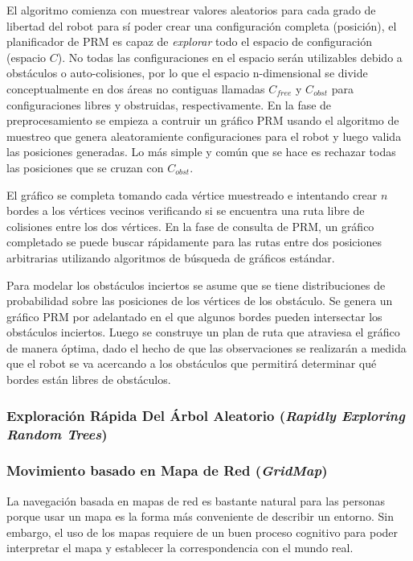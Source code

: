 El algoritmo comienza con muestrear valores aleatorios para cada grado de 
libertad del robot para s\'i poder crear una configuraci\'on completa 
(posici\'on), el planificador de PRM es capaz de \textit{explorar} todo 
el espacio de configuraci\'on (espacio $C$). No todas las configuraciones 
en el espacio ser\'an utilizables debido a obst\'aculos o auto-colisiones, 
por lo que el espacio n-dimensional se divide conceptualmente en dos \'areas 
no contiguas llamadas $C_{free}$ y $C_{obst}$ para configuraciones libres y 
obstruidas, respectivamente. En la fase de preprocesamiento se empieza a 
contruir un gr\'afico PRM usando el algoritmo de muestreo que genera 
aleatoramiente configuraciones para el robot y luego valida las 
posiciones generadas. Lo m\'as simple y com\'un que se hace es rechazar 
todas las posiciones que se cruzan con $C_{obst}$. 

El gr\'afico se completa tomando cada v\'ertice muestreado e intentando 
crear $n$ bordes a los v\'ertices vecinos verificando si se encuentra una 
ruta libre de colisiones entre los dos v\'ertices. En la fase de consulta 
de PRM, un gr\'afico completado se puede buscar r\'apidamente para las 
rutas entre dos posiciones arbitrarias utilizando algoritmos de 
b\'usqueda de gr\'aficos est\'andar.

Para modelar los obst\'aculos inciertos se asume que se tiene distribuciones 
de probabilidad sobre las posiciones de los v\'ertices de los obst\'aculo. Se 
genera un gr\'afico PRM por adelantado en el que algunos bordes pueden 
intersectar los obst\'aculos inciertos. Luego se construye un plan de 
ruta que atraviesa el gr\'afico de manera \'optima, dado el hecho de 
que las observaciones se realizar\'an a medida que el robot se va acercando a 
los obst\'aculos que permitir\'a determinar qu\'e bordes est\'an 
libres de obst\'aculos.

\subsubsection{Exploraci\'on R\'apida Del \'Arbol Aleatorio (\textit{Rapidly Exploring Random Trees})}

\subsubsection{Movimiento basado en Mapa de Red (\textit{GridMap})}

La navegaci\'on basada en mapas de red es bastante natural para las personas 
porque usar un mapa es la forma m\'as conveniente de describir un entorno. 
Sin embargo, el uso de los mapas requiere de un buen proceso cognitivo para 
poder interpretar el mapa y establecer la correspondencia con el mundo real.

